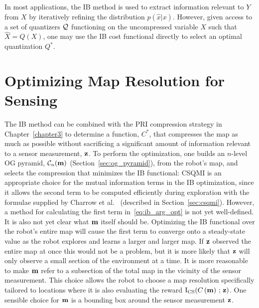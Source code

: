 In most applications, the IB method is used to extract information relevant to $Y$ from $X$ by
iteratively refining the distribution $p(\hat{x} \vert x)$. However, given
access to a set of quantizers $\mathcal{Q}$ functioning on the uncompressed variable
$X$ such that $\hat{X} = Q(X)$, one may use the IB cost functional directly to select an optimal
quantization $Q^{*}$.
%
%

\section{Optimizing Map Resolution for Sensing}
\label{sec:ib_spec}

The IB method can be combined with the PRI compression strategy in
Chapter~\ref{chapter3} to determine a function, $C^{*}$, that compresses the map
as much as possible without sacrificing a significant amount of information relevant
to a sensor measurement,
$\mathbf{z}$. To perform the optimization, one builds an $n$-level OG pyramid,
$\mathcal{C}_{n}(\mathbf{m})$ (Section~\ref{sec:og_pyramid}), from the robot's map, and selects the compression that
minimizes the IB functional:
%
%
CSQMI is an appropriate choice for the mutual information terms in the IB
optimization, since it allows
the second term to be computed efficiently during
exploration with the formulae supplied by Charrow et
al.~\cite{charrow2015icra} (described in Section~\ref{sec:csqmi}). However, a
method for calculating the first term in~\eqref{eq:ib_arg_opt} is not yet well-defined.
It is also not yet clear what $\mathbf{m}$ itself should be. Optimizing the IB functional
over the robot's entire map will cause the first term to converge onto a steady-state value
as the robot explores and learns a larger and larger map. If $\mathbf{z}$ observed the entire map at
once this would not be a problem, but it is more likely that $\mathbf{z}$ will only observe a small
section of the environment at a time. It is more reasonable to make $\mathbf{m}$
refer to a subsection of the total map in the vicinity of the sensor measurement. This choice
allows the robot to choose a map resolution specifically tailored to locations where it is also evaluating
the reward $\text{I}_{\text{CS}}(C\left(\mathbf{m}\right)\, ;\, \mathbf{z})$. One sensible
choice for $\mathbf{m}$ is a bounding box around the sensor measurement $\mathbf{z}$.

